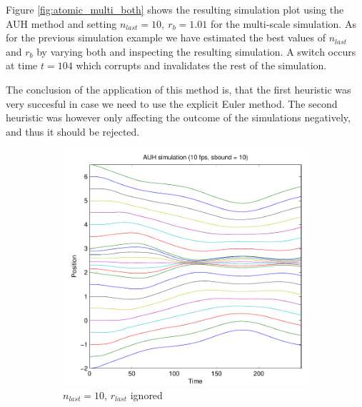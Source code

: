 \documentclass[11pt]{article}
\begin{document}
Figure \ref{fig:atomic_multi_both} shows the resulting simulation plot
using the AUH method and setting $n_{last} = 10,~r_b = 1.01$ for the
multi-scale simulation. As for the previous simulation example we have
estimated the best values of $n_{last}$ and $r_b$ by varying both and
inspecting the resulting simulation. A switch occurs at time $t = 104$ which
corrupts and invalidates the rest of the simulation.

The conclusion of the application of this method is, that the first heuristic
was very succesful in case we need to use the explicit Euler method. The second
heuristic was however only affecting the outcome of the simulations negatively,
and thus it should be rejected.

\begin{figure}[H]
    \begin{subfigure}[t]{0.5\textwidth}
        \includegraphics[width=\textwidth]{../images/atomic_multiscale_10fps_10sbound.pdf}
        \caption{$n_{last} = 10$, $r_{last}$ ignored}
        \label{fig:atomic_multi_10sbound}
    \end{subfigure}
    \begin{subfigure}[t]{0.5\textwidth}

\end{subfigure}
\end{figure}
\end{document}
